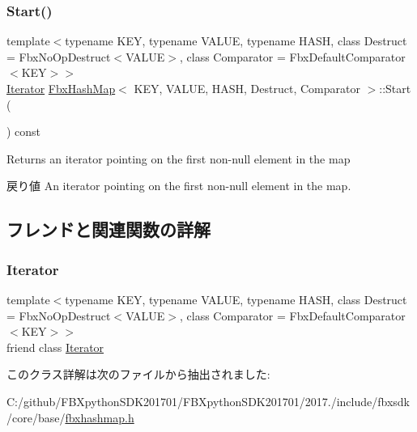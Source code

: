 \subsubsection{\texorpdfstring{Start()}{Start()}}
{\footnotesize\ttfamily template$<$typename K\+EY, typename V\+A\+L\+UE, typename H\+A\+SH, class Destruct = Fbx\+No\+Op\+Destruct$<$\+V\+A\+L\+U\+E$>$, class Comparator = Fbx\+Default\+Comparator$<$\+K\+E\+Y$>$$>$ \\
\hyperlink{class_fbx_hash_map_1_1_iterator}{Iterator} \hyperlink{class_fbx_hash_map}{Fbx\+Hash\+Map}$<$ K\+EY, V\+A\+L\+UE, H\+A\+SH, Destruct, Comparator $>$\+::Start (\begin{DoxyParamCaption}{ }\end{DoxyParamCaption}) const}

Returns an iterator pointing on the first non-\/null element in the map \begin{DoxyReturn}{戻り値}
An iterator pointing on the first non-\/null element in the map. 
\end{DoxyReturn}


\subsection{フレンドと関連関数の詳解}
\mbox{\label{class_fbx_hash_map_a9830fc407400559db7e7783cc10a9394}} 
\subsubsection{\texorpdfstring{Iterator}{Iterator}}
{\footnotesize\ttfamily template$<$typename K\+EY, typename V\+A\+L\+UE, typename H\+A\+SH, class Destruct = Fbx\+No\+Op\+Destruct$<$\+V\+A\+L\+U\+E$>$, class Comparator = Fbx\+Default\+Comparator$<$\+K\+E\+Y$>$$>$ \\
friend class \hyperlink{class_fbx_hash_map_1_1_iterator}{Iterator}\hspace{0.3cm}{\ttfamily [friend]}}



このクラス詳解は次のファイルから抽出されました\+:\begin{DoxyCompactItemize}
\item 
C\+:/github/\+F\+B\+Xpython\+S\+D\+K201701/\+F\+B\+Xpython\+S\+D\+K201701/2017./include/fbxsdk/core/base/\hyperlink{fbxhashmap_8h}{fbxhashmap.\+h}\end{DoxyCompactItemize}
